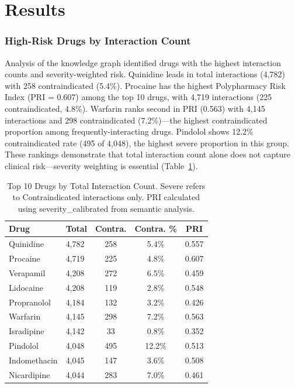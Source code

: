 \documentclass[11pt,a4paper]{article}
\begin{document}
\part{Results}

\section{High-Risk Drugs by Interaction Count}

Analysis of the knowledge graph identified drugs with the highest interaction counts and severity-weighted risk. Quinidine leads in total interactions (4,782) with 258 contraindicated (5.4\%). Procaine has the highest Polypharmacy Risk Index (PRI = 0.607) among the top 10 drugs, with 4,719 interactions (225 contraindicated, 4.8\%). Warfarin ranks second in PRI (0.563) with 4,145 interactions and 298 contraindicated (7.2\%)---the highest contraindicated proportion among frequently-interacting drugs. Pindolol shows 12.2\% contraindicated rate (495 of 4,048), the highest severe proportion in this group. These rankings demonstrate that total interaction count alone does not capture clinical risk---severity weighting is essential (Table~\ref{tab:high_risk_drugs}).

\begin{table}[H]
\centering
\caption{Top 10 Drugs by Total Interaction Count. Severe refers to Contraindicated interactions only. PRI calculated using severity\_calibrated from semantic analysis.}
\label{tab:high_risk_drugs}
\begin{tabular}{llccc}
\toprule
\textbf{Drug} & \textbf{Total} & \textbf{Contra.} & \textbf{Contra. \%} & \textbf{PRI} \\
\midrule
Quinidine & 4,782 & 258 & 5.4\% & 0.557 \\
Procaine & 4,719 & 225 & 4.8\% & 0.607 \\
Verapamil & 4,208 & 272 & 6.5\% & 0.459 \\
Lidocaine & 4,208 & 119 & 2.8\% & 0.548 \\
Propranolol & 4,184 & 132 & 3.2\% & 0.426 \\
Warfarin & 4,145 & 298 & 7.2\% & 0.563 \\
Isradipine & 4,142 & 33 & 0.8\% & 0.352 \\
Pindolol & 4,048 & 495 & 12.2\% & 0.513 \\
Indomethacin & 4,045 & 147 & 3.6\% & 0.508 \\
Nicardipine & 4,044 & 283 & 7.0\% & 0.461 \\
\bottomrule
\end{tabular}
\end{table}
\end{document}

